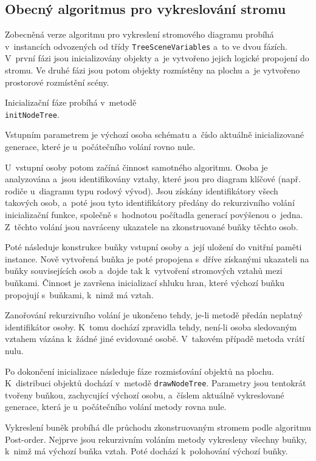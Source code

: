 		\subsection*{Obecný algoritmus pro vykreslování stromu}
		Zobecněná verze algoritmu pro vykreslení stromového diagramu probíhá v~instancích odvozených od třídy \texttt{TreeSceneVariables} a~to ve dvou fázích. V~první fázi jsou inicializovány objekty a~je vytvořeno jejich logické propojení do stromu. Ve druhé fázi jsou potom objekty rozmístěny na plochu a~je vytvořeno prostorové rozmístění scény.\par
		Inicializační fáze probíhá v~metodě \\ \texttt{initNodeTree}. \par 
		Vstupním parametrem je výchozí osoba schématu a~číslo aktuálně inicializované generace, které je u~počátečního volání rovno nule.\par
		U~vstupní osoby potom začíná činnost samotného algoritmu. Osoba je analyzována a~jsou identifikovány vztahy, které jsou pro diagram klíčové (např. rodiče u~diagramu typu rodový vývod). Jsou získány identifikátory všech takových osob, a~poté jsou tyto identifikátory předány do rekurzivního volání inicializační funkce, společně s~hodnotou počítadla generací povýšenou o~jedna. Z~těchto volání jsou navráceny ukazatele na zkonstruované buňky těchto osob. \par
		Poté následuje konstrukce buňky vstupní osoby a~její uložení do vnitřní paměti instance. Nově vytvořená buňka je poté propojena s~dříve získanými ukazateli na buňky souvisejících osob a~dojde tak k~vytvoření stromových vztahů mezi buňkami. Činnost je završena inicializací shluku hran, které výchozí buňku propojují s~buňkami, k~nimž má vztah. \par
		Zanořování rekurzivního volání je ukončeno tehdy, je-li metodě předán neplatný identifikátor osoby. K~tomu dochází zpravidla tehdy, není-li osoba sledovaným vztahem vázána k~žádné jiné evidované osobě. V~takovém případě metoda vrátí nulu.\par
		Po dokončení inicializace následuje fáze rozmisťování objektů na plochu. K~distribuci objektů dochází v~metodě \texttt{drawNodeTree}. Parametry jsou tentokrát tvořeny buňkou, zachycující výchozí osobu, a~číslem aktuálně vykreslované generace, která je u~počátečního volání metody rovna nule. \par 
		Vykreslení buněk probíhá dle průchodu zkonstruovaným stromem podle algoritmu Post-order. Nejprve jsou rekurzivním voláním metody vykresleny všechny buňky, k~nimž má výchozí buňka vztah. Poté dochází k~polohování výchozí buňky. \par

